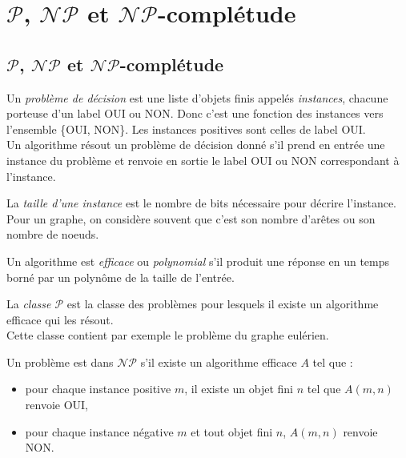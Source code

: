 \section{$\mathcal{P}$, $\mathcal{NP}$ et $\mathcal{NP}$-complétude}
\subsection{$\mathcal{P}$, $\mathcal{NP}$ et $\mathcal{NP}$-complétude}
\begin{mydef}
  Un \emph{problème de décision} est une liste d’objets finis appelés \emph{instances}, chacune porteuse d’un label OUI ou NON. Donc c’est une fonction des instances vers l’ensemble \{OUI, NON\}. Les instances positives sont celles de label OUI.\\
  Un algorithme résout un problème de décision donné s’il prend en entrée une instance du problème et renvoie en sortie le label OUI ou NON correspondant à l’instance.
\end{mydef}

\begin{mydef}
  La \emph{taille d’une instance} est le nombre de bits nécessaire pour décrire l’instance. Pour un graphe, on considère souvent que c’est son nombre d’arêtes ou son nombre de noeuds.
\end{mydef}

\begin{mydef}
  Un algorithme est \emph{efficace} ou \emph{polynomial} s’il produit une réponse en un temps borné par un polynôme de la taille de l’entrée.
\end{mydef}

\begin{mydef}
  La \emph{classe $\mathcal{P}$} est la classe des problèmes pour lesquels il existe un algorithme efficace qui les résout.\\
  Cette classe contient par exemple le problème du graphe eulérien.
\end{mydef}

\begin{mydef}
  Un problème est dans $\mathcal{NP}$ s’il existe un algorithme efficace $A$ tel que :
  \begin{itemize}
    \item pour chaque instance positive $m$, il existe un objet fini $n$ tel que $A(m, n)$ renvoie OUI,
    \item pour chaque instance négative $m$ et tout objet fini $n$, $A(m, n)$ renvoie NON.
  \end{itemize}
\end{mydef}

